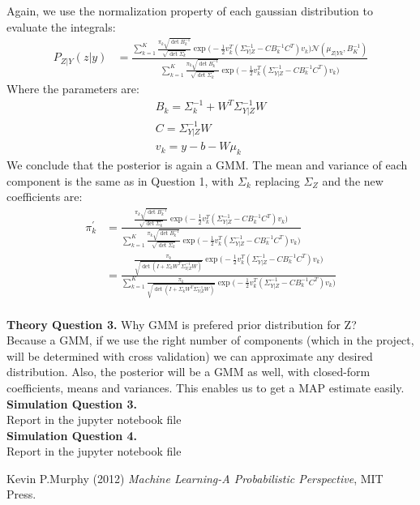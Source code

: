 \documentclass[11pt,a4paper]{article}
\begin{document}
Again, we use the normalization property of each gaussian distribution to evaluate the integrals:
\begin{equation} 
\boxed{
\begin{split}
P_{Z|Y}(z|y)&=\frac{ \sum_{k=1}^K \frac{ \pi_k\sqrt{\det B_k^{-1}} }{\sqrt{\det \Sigma_k}} \exp \Big(-\frac{1}{2}v_k^T(\Sigma_{Y|Z}^{-1}-CB_k^{-1}C^T)v_k\Big) \mathcal{N}(\mu_{Z|Y k},B_K^{-1})} {\sum_{k=1}^K\frac{ \pi_k\sqrt{\det B_k^{-1}} }{\sqrt{\det \Sigma_k}} \exp \Big(-\frac{1}{2}v_k^T(\Sigma_{Y|Z}^{-1}-CB_k^{-1}C^T)v_k\Big)}
\end{split}
}
\end{equation} 
Where the parameters are:
\begin{equation} 
\boxed{
\begin{split}
B_k=\Sigma_{k}^{-1}+W^T\Sigma_{Y|Z}^{-1}W\\
C=\Sigma_{Y|Z}^{-1}W\\
v_k=y-b-W\mu_k
\end{split}
}
\end{equation}
We conclude that the posterior is again a GMM. The mean and variance of each component is the same as in Question 1, with $\Sigma_k$ replacing $\Sigma_Z$ and the new coefficients are:
\begin{equation} 
\boxed{
\begin{split}
\pi^{\prime}_k&=\frac{ \frac{ \pi_k\sqrt{\det B_k^{-1}} }{\sqrt{\det \Sigma_k}} \exp \Big(-\frac{1}{2}v_k^T(\Sigma_{Y|Z}^{-1}-CB_k^{-1}C^T)v_k\Big) } {\sum_{k=1}^K\frac{ \pi_k\sqrt{\det B_k^{-1}} }{\sqrt{\det \Sigma_k}} \exp \Big(-\frac{1}{2}v_k^T(\Sigma_{Y|Z}^{-1}-CB_k^{-1}C^T)v_k\Big)}\\
&=\frac{ \frac{ \pi_k }{\sqrt{\det (I+\Sigma_kW^T\Sigma_{Y|Z}^{-1}W)}} \exp \Big(-\frac{1}{2}v_k^T(\Sigma_{Y|Z}^{-1}-CB_k^{-1}C^T)v_k\Big) } {\sum_{k=1}^K\frac{ \pi_k }{\sqrt{\det (I+\Sigma_kW^T\Sigma_{Y|Z}^{-1}W)}} \exp \Big(-\frac{1}{2}v_k^T(\Sigma_{Y|Z}^{-1}-CB_k^{-1}C^T)v_k\Big)}
\end{split}
}
\end{equation}
\\
\color{blue}
	\large{\textbf{Theory Question 3.}} Why GMM is prefered prior distribution for Z?
	\color{black}
	\\
	Because a GMM, if we use the right number of components (which in the project, will be determined with cross validation) we can approximate any desired distribution. Also, the posterior will be a GMM as well, with closed-form coefficients, means and variances. This enables us to get a MAP estimate easily.\\
\color{ForestGreen}
	\large{\textbf{Simulation Question 3.}} 
	\color{black}
	\\
 Report  in the jupyter notebook file
 \\
	\color{ForestGreen}
	\large{\textbf{Simulation Question 4.}} 
	\color{black}
	\\
  Report  in the jupyter notebook file
	\newpage
	
\color{black}
\begin{thebibliography}{9}
Kevin P.Murphy (2012) \emph{Machine Learning-A Probabilistic Perspective}, MIT Press.

\end{thebibliography}
\end{document}
